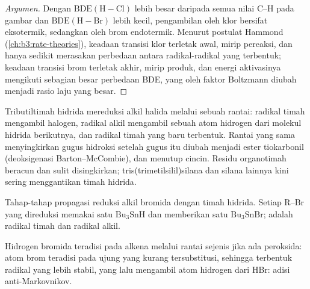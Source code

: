 \begin{proof}[Argumen]
Dengan $\mathrm{BDE(H{-}Cl)}$ lebih besar daripada semua nilai C--H pada gambar dan $\mathrm{BDE(H{-}Br)}$ lebih kecil,
pengambilan oleh klor bersifat eksotermik, sedangkan oleh brom endotermik. Menurut postulat
Hammond (\cref{ch:b3:rate-theories}), keadaan transisi klor terletak awal,
mirip pereaksi, dan hanya sedikit merasakan perbedaan antara radikal-radikal yang terbentuk;
keadaan transisi brom terletak akhir, mirip produk, dan energi aktivasinya mengikuti sebagian besar
perbedaan BDE, yang oleh faktor Boltzmann diubah menjadi rasio laju yang besar.
\end{proof}

Tributiltimah hidrida mereduksi alkil halida melalui sebuah rantai: radikal timah mengambil
halogen, radikal alkil mengambil sebuah atom hidrogen dari molekul hidrida
berikutnya, dan radikal timah yang baru terbentuk. Rantai yang sama menyingkirkan gugus hidroksi
setelah gugus itu diubah menjadi ester tiokarbonil (deoksigenasi Barton--McCombie),
dan menutup cincin. Residu organotimah beracun dan sulit
disingkirkan; tris(trimetilsilil)silana dan silana lainnya kini sering menggantikan timah
hidrida.

\begin{omfigure}

{\small Tahap-tahap propagasi reduksi alkil bromida dengan timah hidrida.
Setiap R--Br yang direduksi memakai satu $\mathrm{Bu_3SnH}$ dan memberikan satu $\mathrm{Bu_3SnBr}$;  adalah radikal timah dan radikal alkil.}
\end{omfigure}

Hidrogen bromida teradisi pada alkena melalui rantai sejenis jika ada
peroksida: atom brom teradisi pada ujung yang kurang tersubstitusi, sehingga terbentuk radikal yang lebih
stabil, yang lalu mengambil atom hidrogen dari HBr: adisi
anti-Markovnikov.

